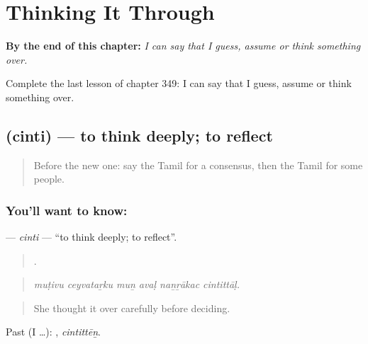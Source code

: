 
\chapter{Thinking It Through}
\label{ch:ta-thinking-it-through}

\begin{chapteropening}
\textbf{By the end of this chapter:} \emph{I can say that I guess, assume or think something over.}

Complete the last lesson of chapter 349: I can say that I guess, assume or think something over.
\end{chapteropening}

\section[\texorpdfstring{\ta{சிந்தி} (cinti)}{சிந்தி (cinti)}]{ (cinti) — to think deeply; to reflect}

\label{lesson:TA-C349-cinti}



\begin{quote}
Before the new one: say the Tamil for a consensus, then the Tamil for some people.
\end{quote}

\subsection*{You'll want to know: }
\textbf{} — \emph{cinti} — \textquotedblleft{}to think deeply; to reflect\textquotedblright{}.

\begin{quote}
     .
\end{quote}

\begin{quote}
\emph{muṭivu ceyvataṟku muṉ avaḷ naṉṟākac cintittāḷ.}
\end{quote}

\begin{quote}
She thought it over carefully before deciding.
\end{quote}

Past (I …): , \emph{cintittēṉ}.

